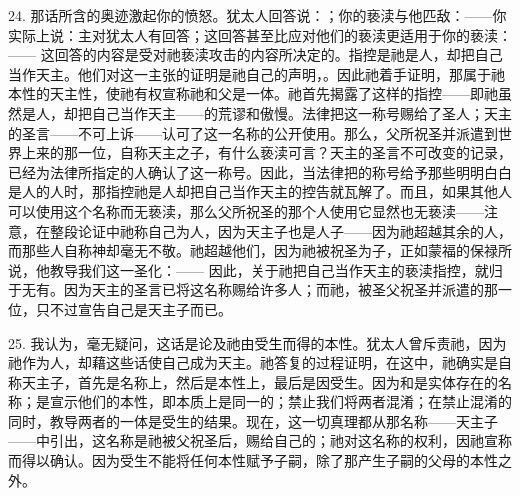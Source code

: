 24. 那话所含的奥迹激起你的愤怒。犹太人回答说：；你的亵渎与他匹敌：——你实际上说：主对犹太人有回答；这回答甚至比应对他们的亵渎更适用于你的亵渎：—— 这回答的内容是受对祂亵渎攻击的内容所决定的。指控是祂是人，却把自己当作天主。他们对这一主张的证明是祂自己的声明，。因此祂着手证明，那属于祂本性的天主性，使祂有权宣称祂和父是一体。祂首先揭露了这样的指控——即祂虽然是人，却把自己当作天主——的荒谬和傲慢。法律把这一称号赐给了圣人；天主的圣言——不可上诉——认可了这一名称的公开使用。那么，父所祝圣并派遣到世界上来的那一位，自称天主之子，有什么亵渎可言？天主的圣言不可改变的记录，已经为法律所指定的人确认了这一称号。因此，当法律把的称号给予那些明明白白是人的人时，那指控祂是人却把自己当作天主的控告就瓦解了。而且，如果其他人可以使用这个名称而无亵渎，那么父所祝圣的那个人使用它显然也无亵渎——注意，在整段论证中祂称自己为人，因为天主子也是人子——因为祂超越其余的人，而那些人自称神却毫无不敬。祂超越他们，因为祂被祝圣为子，正如蒙福的保禄所说，他教导我们这一圣化：—— 因此，关于祂把自己当作天主的亵渎指控，就归于无有。因为天主的圣言已将这名称赐给许多人；而祂，被圣父祝圣并派遣的那一位，只不过宣告自己是天主子而已。\par

25. 我认为，毫无疑问，这话是论及祂由受生而得的本性。犹太人曾斥责祂，因为祂作为人，却藉这些话使自己成为天主。祂答复的过程证明，在这中，祂确实是自称天主子，首先是名称上，然后是本性上，最后是因受生。因为和是实体存在的名称；是宣示他们的本性，即本质上是同一的；禁止我们将两者混淆；在禁止混淆的同时，教导两者的一体是受生的结果。现在，这一切真理都从那名称——天主子——中引出，这名称是祂被父祝圣后，赐给自己的；祂对这名称的权利，因祂宣称而得以确认。因为受生不能将任何本性赋予子嗣，除了那产生子嗣的父母的本性之外。\par

